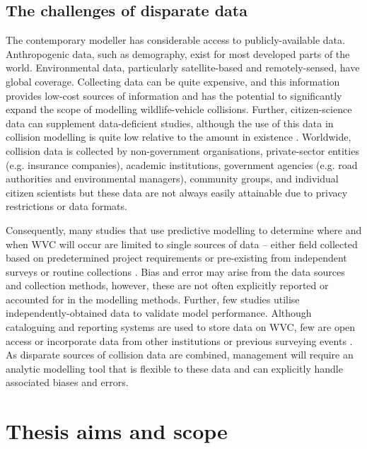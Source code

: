 \subsection{The challenges of disparate data}

The contemporary modeller has considerable access to publicly-available data. Anthropogenic data, such as demography, exist for most developed parts of the world. Environmental data, particularly satellite-based and remotely-sensed, have global coverage. Collecting data can be quite expensive, and this information provides low-cost sources of information and has the potential to significantly expand the scope of modelling wildlife-vehicle collisions. Further, citizen-science data can supplement data-deficient studies, although the use of this data in collision modelling is quite low relative to the amount in existence \citep[but see][]{paul14}. Worldwide, collision data is collected by non-government organisations, private-sector entities (e.g. insurance companies), academic institutions, government agencies (e.g. road authorities and environmental managers), community groups, and individual citizen scientists but these data are not always easily attainable due to privacy restrictions or data formats. 

Consequently, many studies that use predictive modelling to determine where and when WVC will occur are limited to single sources of data -- either field collected based on predetermined project requirements \citep[e.g.][]{lang09,roge09} or pre-existing from independent surveys or routine collections \citep[e.g.][]{hoth12,malo04}. Bias and error may arise from the data sources and collection methods, however, these are not often explicitly reported or accounted for in the modelling methods. Further, few studies utilise independently-obtained data to validate model performance. Although cataloguing and reporting systems are used to store data on WVC, few are open access or incorporate data from other institutions or previous surveying events \citep[but see][]{shil15b}. As disparate sources of collision data are combined, management will require an analytic modelling tool that is flexible to these data and can explicitly handle associated biases and errors.

\section{Thesis aims and scope}

